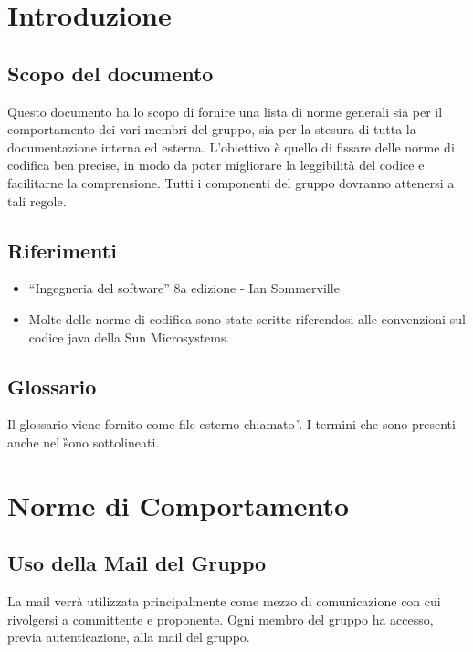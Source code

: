 \begin{center}
\begin{table}[hbtp]
\end{table}
\end{center}


\newpage
\tableofcontents 

\chapter{Introduzione}
\section{Scopo del documento}
Questo documento ha lo scopo di fornire una lista di norme generali sia per il comportamento dei vari membri del gruppo, sia per la stesura di tutta la documentazione interna ed esterna. L'obiettivo \`e quello di fissare delle norme di codifica ben precise, in modo da poter migliorare la leggibilit\`a del codice e facilitarne la comprensione. Tutti i componenti del gruppo dovranno attenersi a tali regole.
\section{Riferimenti}
\begin{itemize}
\item ``Ingegneria del software'' 8a edizione - Ian Sommerville 
\item Molte delle norme di codifica sono state scritte riferendosi alle convenzioni sul codice java della Sun Microsystems.
\end{itemize}
\section{Glossario}
Il glossario viene fornito come file esterno chiamato \G. I termini che sono presenti anche nel \G sono sottolineati.

\chapter{Norme di Comportamento}
\section{Uso della Mail del Gruppo}
La mail verr\`a utilizzata principalmente come mezzo di comunicazione con cui rivolgersi a committente e proponente. Ogni membro del gruppo ha accesso, previa autenticazione, alla mail del gruppo.

